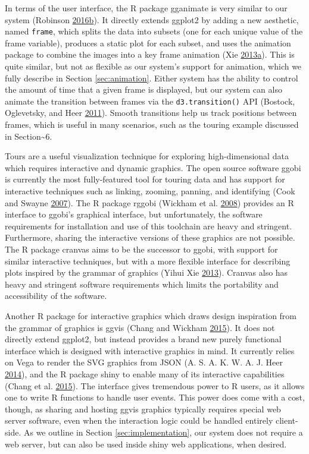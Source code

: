 \documentclass[12pt,]{isuthesis}
\begin{document}
In terms of the user interface, the R package gganimate is very similar
to our system (Robinson
\protect\hyperlink{ref-gganimate}{2016}\protect\hyperlink{ref-gganimate}{b}).
It directly extends ggplot2 by adding a new aesthetic, named
\texttt{frame}, which splits the data into subsets (one for each unique
value of the frame variable), produces a static plot for each subset,
and uses the animation package to combine the images into a key frame
animation (Xie
\protect\hyperlink{ref-animation}{2013}\protect\hyperlink{ref-animation}{a}).
This is quite similar, but not as flexible as our system's support for
animation, which we fully describe in Section \ref{sec:animation}.
Either system has the ability to control the amount of time that a given
frame is displayed, but our system can also animate the transition
between frames via the \texttt{d3.transition()} API (Bostock,
Oglevetsky, and Heer \protect\hyperlink{ref-d3}{2011}). Smooth
transitions help us track positions between frames, which is useful in
many scenarios, such as the touring example discussed in
Section\textasciitilde{}6.

Tours are a useful visualization technique for exploring
high-dimensional data which requires interactive and dynamic graphics.
The open source software ggobi is currently the most fully-featured tool
for touring data and has support for interactive techniques such as
linking, zooming, panning, and identifying (Cook and Swayne
\protect\hyperlink{ref-ggobi:2007}{2007}). The R package rggobi (Wickham
et al. \protect\hyperlink{ref-rggobi}{2008}) provides an R interface to
ggobi's graphical interface, but unfortunately, the software
requirements for installation and use of this toolchain are heavy and
stringent. Furthermore, sharing the interactive versions of these
graphics are not possible. The R package cranvas aims to be the
successor to ggobi, with support for similar interactive techniques, but
with a more flexible interface for describing plots inspired by the
grammar of graphics (Yihui Xie \protect\hyperlink{ref-cranvas}{2013}).
Cranvas also has heavy and stringent software requirements which limits
the portability and accessibility of the software.

Another R package for interactive graphics which draws design
inspiration from the grammar of graphics is ggvis (Chang and Wickham
\protect\hyperlink{ref-ggvis}{2015}). It does not directly extend
ggplot2, but instead provides a brand new purely functional interface
which is designed with interactive graphics in mind. It currently relies
on Vega to render the SVG graphics from JSON (A. S. A. K. W. A. J. Heer
\protect\hyperlink{ref-vega}{2014}), and the R package shiny to enable
many of its interactive capabilities (Chang et al.
\protect\hyperlink{ref-shiny}{2015}). The interface gives tremendous
power to R users, as it allows one to write R functions to handle user
events. This power does come with a cost, though, as sharing and hosting
ggvis graphics typically requires special web server software, even when
the interaction logic could be handled entirely client-side. As we
outline in Section \ref{sec:implementation}, our system does not require
a web server, but can also be used inside shiny web applications, when
desired.
\end{document}

